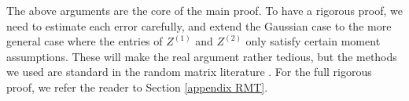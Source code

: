 %


The above arguments are the core of the main proof. To have a rigorous proof, we need to estimate each error carefully, and extend the Gaussian case to the more general case where the entries of $Z^{(1)}$ and $Z^{(2)}$ only satisfy certain moment assumptions. These will make the real argument rather tedious, but the methods we used are standard in the random matrix literature \cite{erdos2017dynamical,Anisotropic}. For the full rigorous proof, we refer the reader to Section \ref{appendix RMT}.


